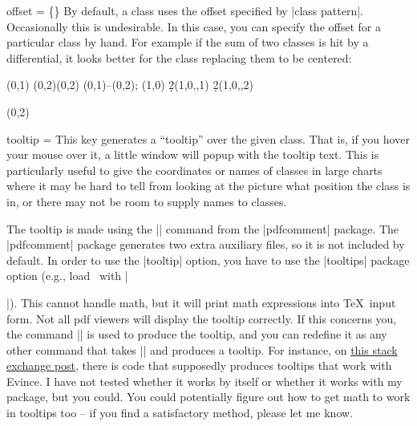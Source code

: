 \begin{sseqdata}[name = basic, cohomological Serre grading]
\begin{key}{offset = \{\}}
By default, a class uses the offset specified by |class pattern|. Occasionally this is undesirable. In this case, you can specify the offset for a particular class by hand. For example if the sum of two classes is hit by a differential, it looks better for the class replacing them to be centered:
\begin{codeexample}[width = 9cm]
\begin{sseqdata}[ name = offset example,
    xscale = 0.7,
    Adams grading,
    class placement transform = {scale = 1.8} ]
\class(0,1)
\class(0,2)\class(0,2)
\draw(0,1)--(0,2);
\class(1,0)
\d2(1,0,,1)
\replacetarget
\d2(1,0,,2)
\end{sseqdata}
\printpage[name = offset example, page=2]
\printpage[name = offset example, page=3]
\begin{sseqpage}[name = offset example, page=3]
\classoptions[offset = {(0,0)}](0,2)
\end{sseqpage}
\end{codeexample}
\end{key}

\begin{key}{tooltip = }
This key generates a ``tooltip'' over the given class. That is, if you hover your mouse over it, a little window will popup with the tooltip text. This is particularly useful to give the coordinates or names of classes in large charts where it may be hard to tell from looking at the picture what position the class is in, or there may not be room to supply names to classes.

The tooltip is made using the |\pdftooltip| command from the |pdfcomment| package. The |pdfcomment| package generates two extra auxiliary files, so it is not included by default. In order to use the |tooltip| option, you have to use the |tooltips| package option (e.g., load \sseqpages\ with |\usepackage[tooltips]{spectralsequences}|). This cannot handle math, but it will print math expressions into \TeX\ input form. Not all pdf viewers will display the tooltip correctly. If this concerns you, the command |\sseqtooltip| is used to produce the tooltip, and you can redefine it as any other command that takes |\sseqtooltip| and produces a tooltip. For instance, on \href{https://tex.stackexchange.com/a/164186/23866}{this stack exchange post}, there is code that supposedly produces tooltips that work with Evince. I have not tested whether it works by itself or whether it works with my package, but you could. You could potentially figure out how to get math to work in tooltips too -- if you find a satisfactory method, please let me know.


\end{key}
\end{sseqdata}
